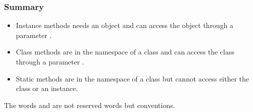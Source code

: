 \documentclass[hyperref={pdfpagelabels=false},table]{beamer}
\begin{document}
\begin{frame}\frametitle{Summary}

  \begin{itemize}
    \item Instance methods needs an object and can access the object through a parameter .
    \item Class methods are in the namespace of a class and can access the class through a parameter .
    \item Static methods are in the namespace of a class but cannot access either the class or an instance.
  \end{itemize}

  \pause

  \vskip 5pt 

  The words  and  are not reserved words but conventions.
\end{frame}


\end{document}
